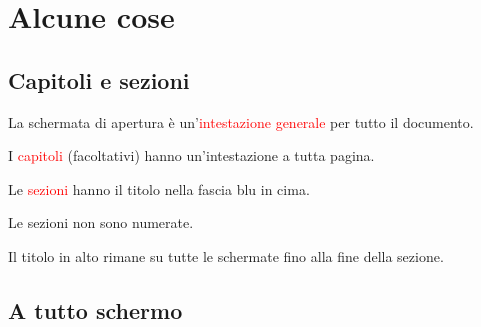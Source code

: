 \documentclass[italian,landscape]{report}
\newcommand{\rosso}[1]{\textcolor{red}{#1}}
\begin{document}
\maketitle

\tableofcontents

\chapter{Alcune cose\label{intestazioneCapitolo}}


\section{Capitoli e sezioni}

\begin{firstheadlineitemize}

\item La schermata di apertura \`e un'\rosso{intesta\-zione generale} per tutto il documento.

\pause

\item I \rosso{capitoli} (facoltativi) hanno un'intestazione a tutta pagina.

\pause

\item Le \rosso{sezioni} hanno il titolo nella fascia blu in cima.

\begin{secondheadlineitemize}

\pause

\item Le sezioni non sono numerate.

\newpage

\item Il titolo in alto rimane su tutte le schermate fino alla fine della sezione.

\end{secondheadlineitemize}

\end{firstheadlineitemize}

\section{A tutto schermo}
\end{document}
